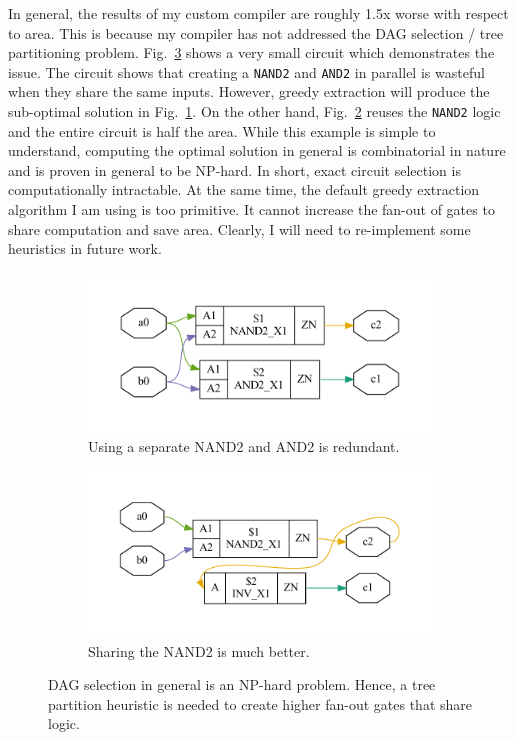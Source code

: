 \documentclass[10pt,letterpaper]{article}
\begin{document}
In general, the results of my custom compiler are roughly 1.5x worse with
respect to area. This is because my compiler has not addressed the DAG
selection / tree partitioning problem. Fig.~\ref{fig:dag} shows a very small
circuit which demonstrates the issue. The circuit shows that creating a
\texttt{NAND2} and \texttt{AND2} in parallel is wasteful when they share the
same inputs. However, greedy extraction will produce the sub-optimal solution
in Fig.~\ref{fig:dag:bad}. On the other hand, Fig.~\ref{fig:dag:good} reuses
the \texttt{NAND2} logic and the entire circuit is half the area. While this
example is simple to understand, computing the optimal solution in general is
combinatorial in nature and is proven in general to be NP-hard. In short, exact
circuit selection is computationally intractable. At the same time, the default
greedy extraction algorithm I am using is too primitive. It cannot increase the
fan-out of gates to share computation and save area. Clearly, I will need to
re-implement some heuristics in future work.

\begin{figure}[h]
    \begin{subfigure}{0.48\textwidth}
        \centering
        \includegraphics[width=\textwidth]{img/bad.pdf}
        \caption{Using a separate NAND2 and AND2 is redundant.}\label{fig:dag:bad}
    \end{subfigure}
    \begin{subfigure}{0.48\textwidth}
        \centering
        \includegraphics[width=\textwidth]{img/good.pdf}
        \caption{Sharing the NAND2 is much better.}\label{fig:dag:good}
    \end{subfigure}
    \caption{DAG selection in general is an NP-hard problem. Hence, a tree partition heuristic is needed to create higher fan-out gates that share logic.}\label{fig:dag}
\end{figure}
\end{document}
